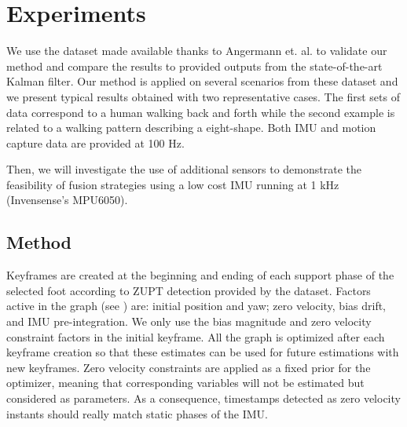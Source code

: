 
\section{Experiments} \label{sec:experiments}

We use the dataset made available thanks to Angermann et. al. \cite{angermann2010high} to validate our method and compare the results to provided outputs from the state-of-the-art Kalman filter.
Our method is applied on several scenarios from these dataset and we present typical results obtained with two representative cases. The first sets of data correspond to a human walking back and forth 
while the second example is related to a walking pattern describing a eight-shape. Both IMU and motion capture data are provided at 100 Hz.

Then, we will investigate the use of additional sensors to demonstrate the feasibility of fusion strategies using a low cost IMU running at 1 kHz (Invensense's MPU6050).


\subsection{Method}

Keyframes are created at the beginning and ending of each support phase of the selected foot according to ZUPT detection provided by the dataset. Factors active in the graph (see ) are: initial position and yaw; zero velocity, bias drift, and IMU pre-integration. We only use the bias magnitude 
and zero velocity constraint factors in the initial keyframe. All the graph is optimized after each keyframe creation so that these estimates can be used for future estimations with new keyframes. Zero velocity constraints are applied 
as a fixed prior for the optimizer, meaning that corresponding variables will not be estimated but considered as parameters. 
As a consequence, timestamps detected as zero velocity instants should really match static phases of the IMU. 

